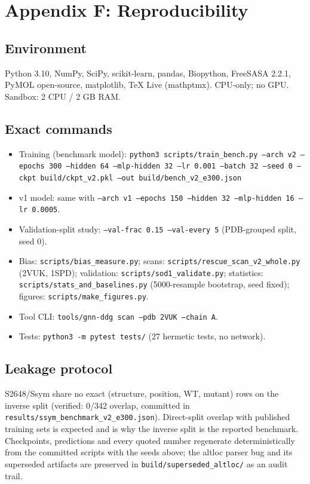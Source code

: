 \section*{Appendix F: Reproducibility}
\subsection*{Environment}
Python 3.10, NumPy, SciPy, scikit-learn, pandas, Biopython, FreeSASA
2.2.1, PyMOL open-source, matplotlib, TeX Live (mathptmx). CPU-only; no
GPU. Sandbox: 2 CPU / 2 GB RAM.
\subsection*{Exact commands}
\begin{itemize}
\item Training (benchmark model): \texttt{python3 scripts/train\_bench.py
--arch v2 --epochs 300 --hidden 64 --mlp-hidden 32 --lr 0.001 --batch 32
--seed 0 --ckpt build/ckpt\_v2.pkl --out build/bench\_v2\_e300.json}
\item v1 model: same with \texttt{--arch v1 --epochs 150 --hidden 32
--mlp-hidden 16 --lr 0.0005}.
\item Validation-split study: \texttt{--val-frac 0.15 --val-every 5}
(PDB-grouped split, seed 0).
\item Bias: \texttt{scripts/bias\_measure.py}; scans:
\texttt{scripts/rescue\_scan\_v2\_whole.py} (2VUK, 1SPD);
validation: \texttt{scripts/sod1\_validate.py}; statistics:
\texttt{scripts/stats\_and\_baselines.py} (5000-resample bootstrap,
seed fixed); figures: \texttt{scripts/make\_figures.py}.
\item Tool CLI: \texttt{tools/gnn-ddg scan --pdb 2VUK --chain A}.
\item Tests: \texttt{python3 -m pytest tests/} (27 hermetic tests,
no network).
\end{itemize}
\subsection*{Leakage protocol}
S2648/Ssym share no exact (structure, position, WT, mutant) rows on the
inverse split (verified: 0/342 overlap, committed in
\texttt{results/ssym\_benchmark\_v2\_e300.json}). Direct-split overlap
with published training sets is expected and is why the inverse split is
the reported benchmark. Checkpoints, predictions and every quoted
number regenerate deterministically from the committed scripts with the
seeds above; the altloc parser bug and its superseded artifacts are
preserved in \texttt{build/superseded\_altloc/} as an audit trail.
